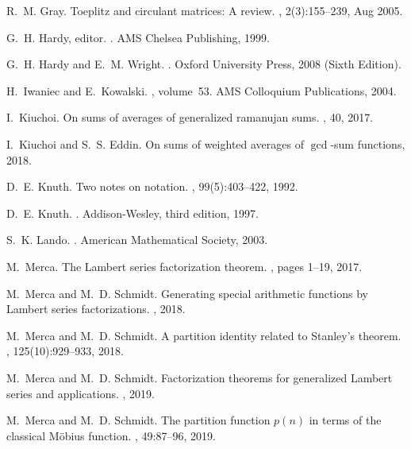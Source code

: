 \documentclass[12pt,reqno,a4letter]{article}
\numberwithin{figure}{section}
\numberwithin{table}{section}
\numberwithin{equation}{section}
\theoremstyle{plain}
\numberwithin{theorem}{section}
\theoremstyle{definition}
\begin{document}
\begin{thebibliography}{10}
R.~M. Gray.
\newblock Toeplitz and circulant matrices: A review.
, 2(3):155–239, {A}ug 2005.

G.~H. Hardy, editor.
.
\newblock AMS Chelsea Publishing, 1999.

G.~H. Hardy and E.~M. Wright.
.
\newblock Oxford University Press, 2008 (Sixth Edition).

H.~Iwaniec and E.~Kowalski.
, volume~53.
\newblock AMS Colloquium Publications, 2004.

I.~Kiuchoi.
\newblock On sums of averages of generalized ramanujan sums.
, 40, 2017.

I.~Kiuchoi and S.~S. Eddin.
\newblock On sums of weighted averages of $\gcd$-sum functions, 2018.

D.~E. Knuth.
\newblock Two notes on notation.
, 99(5):403--422, 1992.

D.~E. Knuth.
.
\newblock Addison-Wesley, third edition, 1997.

S.~K. Lando.
.
\newblock American Mathematical Society, 2003.

M.~Merca.
\newblock The {L}ambert series factorization theorem.
, pages 1--19, 2017.

M.~Merca and M.~D. Schmidt.
\newblock Generating special arithmetic functions by {L}ambert series
  factorizations.
, 2018.

M.~Merca and M.~D. Schmidt.
\newblock A partition identity related to {S}tanley's theorem.
, 125(10):929--933, 2018.

M.~Merca and M.~D. Schmidt.
\newblock Factorization theorems for generalized {L}ambert series and
  applications.
, 2019.

M.~Merca and M.~D. Schmidt.
\newblock The partition function $p(n)$ in terms of the classical
  {M}{\"{o}}bius function.
, 49:87--96, 2019.


\end{thebibliography}
\end{document}
